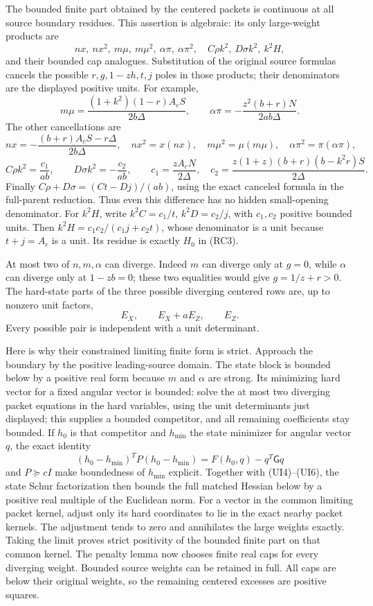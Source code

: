 The bounded finite part obtained by the centered packets is
continuous at all source boundary residues. This assertion is
algebraic: its only large-weight products are
\[
 nx,\ nx^2,\ m\mu,\ m\mu^2,\ \alpha\pi,\ \alpha\pi^2,
 \quad C\rho k^2,\ D\sigma k^2,\ k^2H,
\]
and their bounded cap analogues. Substitution of the original source
formulas cancels the possible $r,g,1-zh,t,j$ poles in those products;
their denominators are the displayed positive units. For example,
\[
 m\mu=\frac{(1+k^2)(1-r)A_cS}{2b\Delta},\qquad
 \alpha\pi=-\frac{z^2(b+r)N}{2ab\Delta}.
\]
The other cancellations are
\[
 nx=-\frac{(b+r)A_cS-r\Delta}{2b\Delta},\quad
 nx^2=x(nx),\quad m\mu^2=\mu(m\mu),\quad
 \alpha\pi^2=\pi(\alpha\pi),
\]
\[
 C\rho k^2=\frac{c_1}{ab},\qquad
 D\sigma k^2=-\frac{c_2}{ab},\qquad
 c_1=\frac{zA_cN}{2\Delta},\quad
 c_2=\frac{z(1+z)(b+r)(b-k^2r)S}{2\Delta}.
\]
Finally $C\rho+D\sigma=(Ct-Dj)/(ab)$, using the exact canceled
formula in the full-parent reduction. Thus even this difference has
no hidden small-opening denominator.
For $k^2H$, write $k^2C=c_1/t$, $k^2D=c_2/j$, with
$c_1,c_2$ positive bounded units. Then
$k^2H=c_1c_2/(c_1j+c_2t)$, whose denominator is a unit because
$t+j=A_c$ is a unit. Its residue is exactly $H_0$ in (RC3).

At most two of $n,m,\alpha$ can diverge. Indeed $m$ can diverge
only at $g=0$, while $\alpha$ can diverge only at $1-zb=0$;
these two equalities would give $g=1/z+r>0$. The hard-state parts
of the three possible diverging centered rows are, up to nonzero
unit factors,
\[
                   E_X,\qquad E_X+aE_Z,\qquad E_Z.
\]
Every possible pair is independent with a unit determinant.

Here is why their constrained limiting finite form is strict.
Approach the boundary by the positive leading-source domain. The
state block is bounded below by a positive real form because $m$ and
$\alpha$ are strong. Its minimizing hard vector for a fixed angular
vector is bounded: solve the at most two diverging packet equations
in the hard variables, using the unit determinants just displayed;
this supplies a bounded competitor, and all remaining coefficients
stay bounded. If $h_0$ is that competitor and $h_{\min}$ the state
minimizer for angular vector $q$, the exact identity
\[
 (h_0-h_{\min})^TP(h_0-h_{\min})
       =F(h_0,q)-q^T\mathsf Gq
\]
and $P\succeq cI$ make boundedness of $h_{\min}$ explicit.
Together with (UI4)--(UI6), the state Schur factorization
then bounds the full matched Hessian below by a positive real multiple
of the Euclidean norm. For a vector in the common limiting packet
kernel, adjust only its hard coordinates to lie in the exact nearby
packet kernels. The adjustment tends to zero and annihilates the
large weights exactly. Taking the limit proves strict positivity of
the bounded finite part on that common kernel. The penalty lemma now
chooses finite real caps for every diverging weight. Bounded source
weights can be retained in full. All caps are below their original
weights, so the remaining centered excesses are positive squares.

